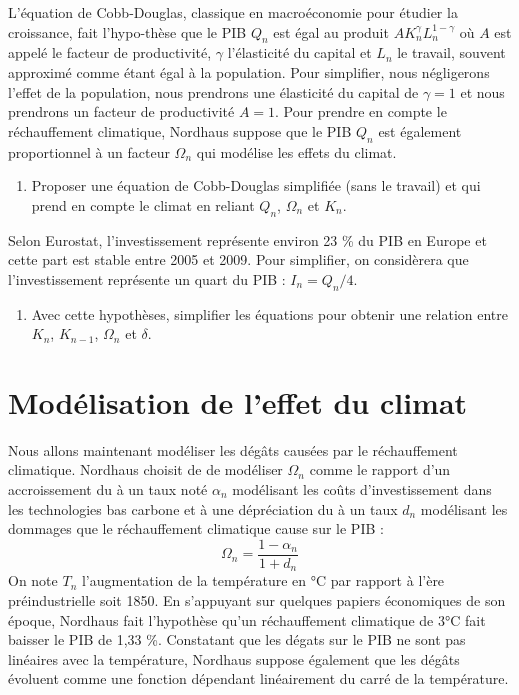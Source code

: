 \documentclass[12pt]{article}
\newcommand{\ques}[1]{\begin{enumerate}[resume]
\item  #1
\end{enumerate}}
\newcommand{\rep}[1]{\textit{Réponse :} #1 \\}
\renewcommand{\rep}[1]{ }
\theoremstyle{remark}
\begin{document}
L'équation de Cobb-Douglas, classique en macroéconomie pour étudier la croissance, fait l'hypo-thèse que le PIB $Q_n$ est égal au produit $AK_n^\gamma L_n^{1-\gamma}$ où $A$ est appelé le facteur de productivité, $\gamma$ l'élasticité du capital et $L_n$ le travail, souvent approximé comme étant égal à la population.
Pour simplifier, nous négligerons l'effet de la population, nous prendrons une élasticité du capital de $\gamma=1$ et nous prendrons un facteur de productivité $A=1$.
Pour prendre en compte le réchauffement climatique, Nordhaus suppose que le PIB $Q_n$ est également proportionnel à un facteur $\Omega_n$ qui modélise les effets du climat. 
\ques{  Proposer une équation de Cobb-Douglas simplifiée (sans le travail) et qui prend en compte le climat en reliant $Q_{n}$, $\Omega_n$ et $K_{n}$.
}
\rep{ $Q_{n}=A \Omega_n K_n$ }
Selon Eurostat, l'investissement représente environ 23 \% du PIB en Europe et cette part est stable entre 2005 et 2009. Pour simplifier, on considèrera que l'investissement représente un quart du PIB : $I_n=Q_n/4$.
\ques{Avec cette hypothèses, simplifier les équations pour obtenir une relation entre $K_n$, $K_{n-1}$, $\Omega_n$ et $\delta$. \label{ques:dynamique_K_1}}
\rep{\begin{equation*} K_n=\frac{1- \delta}{1- \frac{A\Omega_n}{4}} K_{n-1}\end{equation*}}


\section{Modélisation de l'effet du climat}

Nous allons maintenant modéliser les dégâts causées par le réchauffement climatique. Nordhaus choisit de de modéliser $\Omega_n$ comme le rapport d'un accroissement du à un taux noté $\alpha_n$ modélisant les coûts d'investissement dans les technologies bas carbone et à une dépréciation du à un taux $d_n$ modélisant les dommages que le réchauffement climatique cause sur le PIB :
\begin{equation*}
\Omega_n=\frac{1-\alpha_n}{1+d_n}
\end{equation*}
On note $T_n$ l'augmentation de la température en °C par rapport à l'ère préindustrielle soit 1850.
En s'appuyant sur quelques papiers économiques de son époque, Nordhaus fait l'hypothèse qu'un réchauffement climatique de 3°C fait baisser le PIB de 1,33 \%. 
Constatant que les dégats sur le PIB ne sont pas linéaires avec la température, Nordhaus suppose également que les dégâts évoluent comme une fonction dépendant linéairement du carré de la température.
\end{document}
